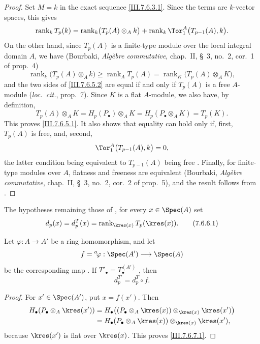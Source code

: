 \begin{proof}
Set $M=k$ in the exact sequence \eqref{III.7.6.3.1}.  Since
the terms are $k$-vector spaces, this gives
\[
  \operatorname{rank}_k T_p(k)
  =
  \operatorname{rank}_k\bigl(T_p(A)\otimes_A k\bigr)
  +
  \operatorname{rank}_k
  \Tor_1^A\bigl(T_{p-1}(A),k\bigr).
\]
On the other hand, since $T_p(A)$ is a finite-type module
over the local integral domain $A$, we have (Bourbaki,
\emph{Alg\`ebre commutative}, chap.~II, \S~3, no.~2,
cor.~1 of prop.~4)
\[
  \operatorname{rank}_k\bigl(T_p(A)\otimes_A k\bigr)
  \geq
  \operatorname{rank}_A T_p(A)
  =
  \operatorname{rank}_K\bigl(T_p(A)\otimes_A K\bigr),
  \tag{7.6.5.2}\label{III.7.6.5.2}
\]
and the two sides of \eqref{III.7.6.5.2} are equal if and
only if $T_p(A)$ is a free $A$-module (\emph{loc.\ cit.},
prop.~7).  Since $K$ is a flat $A$-module, we also have, by
definition,
\[
  T_p(A)\otimes_A K
  =
  H_p(P_\bullet)\otimes_A K
  =
  H_p(P_\bullet\otimes_A K)
  =
  T_p(K).
\]
This proves \eqref{III.7.6.5.1}.  It also shows that equality
can hold only if, first, $T_p(A)$ is free, and, second,
\[
  \Tor_1^A\bigl(T_{p-1}(A),k\bigr)=0,
\]
the latter condition being equivalent to $T_{p-1}(A)$ being
free .  Finally, for finite-type modules
over $A$, flatness and freeness are equivalent (Bourbaki,
\emph{Alg\`ebre commutative}, chap.~II, \S~3, no.~2,
cor.~2 of prop.~5), and the result follows from
.
\end{proof}

\begin{env}[7.6.6]
\label{III.7.6.6}
The hypotheses remaining those of , for
every $x\in\Spec(A)$ set
\[
  d_p(x)=d_p^T(x)
  =
  \operatorname{rank}_{\kres(x)}T_p(\kres(x)).
  \tag{7.6.6.1}\label{III.7.6.6.1}
\]
\end{env}

\begin{lemma}[7.6.7]
\label{III.7.6.7}
Let $\varphi:A\to A'$ be a ring homomorphism, and let
\[
  f={}^a\!\varphi:\Spec(A')\longrightarrow\Spec(A)
\]
be the corresponding map .  If
$T'_\bullet=T_\bullet^{(A')}$ , then
\[
  d_p^{T'}=d_p^T\circ f.
  \tag{7.6.7.1}\label{III.7.6.7.1}
\]
\end{lemma}

\begin{proof}
For $x'\in\Spec(A')$, put $x=f(x')$.  Then
\begin{align*}
  H_\bullet(P_\bullet\otimes_A\kres(x'))
  &=
  H_\bullet\bigl(
    (P_\bullet\otimes_A\kres(x))
    \otimes_{\kres(x)}\kres(x')
  \bigr)\\
  &=
  H_\bullet(P_\bullet\otimes_A\kres(x))
  \otimes_{\kres(x)}\kres(x'),
\end{align*}
because $\kres(x')$ is flat over $\kres(x)$.  This proves
\eqref{III.7.6.7.1}.
\end{proof}

